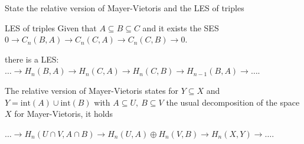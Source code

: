 State the relative version of Mayer-Vietoris and the LES of triples 

LES of triples 
Given that \( A \subseteq B \subseteq C \) and it exists the SES 
\( 0 \longrightarrow C_n(B, A) \longrightarrow C_n(C, A) \longrightarrow C_n(C, B) \longrightarrow 0\).

there is a LES:
\( \dots \longrightarrow H_n(B, A) \longrightarrow H_n(C, A) \longrightarrow H_n(C, B) \longrightarrow H_{n-1}(B, A) \longrightarrow \dots \).

The relative version of Mayer-Vietoris states for \( Y \subseteq X \) and \( Y = \text{int}(A) \cup \text{int}(B) \)
with \( A \subseteq U,\ B \subseteq V \) the usual decomposition of the space \( X \) for Mayer-Vietoris, it holds

\( \dots \longrightarrow H_n(U \cap V, A \cap B) \longrightarrow H_n(U, A) \oplus H_n(V, B) \longrightarrow H_{n}(X, Y) \longrightarrow \dots \).
